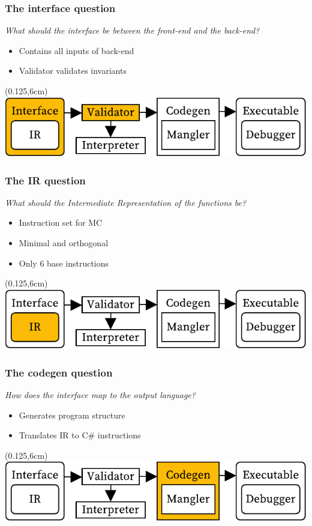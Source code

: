 \documentclass[xetex,serif,aspectratio=169]{beamer}
\begin{document}
\begin{frame}[t]
\end{frame}\begin{frame}[t]\frametitle{The interface question}
\textit{What should the interface be between the front-end and the back-end?}
\begin{itemize}
    \item Contains all inputs of back-end 
    \item Validator validates invariants
\end{itemize}
\begin{textblock*}{0.75\paperwidth}(0.125\paperwidth,6cm)\includegraphics[width=0.75\paperwidth]{overview_interface}\end{textblock*}

\end{frame}\begin{frame}[t]\frametitle{The IR question}
\textit{What should the Intermediate Representation of the functions be?}
\begin{itemize}
    \item Instruction set for MC
    \item Minimal and orthogonal
    \item Only 6 base instructions
\end{itemize}
\begin{textblock*}{0.75\paperwidth}(0.125\paperwidth,6cm)\includegraphics[width=0.75\paperwidth]{overview_ir}\end{textblock*}

\end{frame}\begin{frame}[t]\frametitle{The codegen question}
\textit{How does the interface map to the output language?}
\begin{itemize}
    \item Generates program structure
    \item Translates IR to C\# instructions
\end{itemize}
\begin{textblock*}{0.75\paperwidth}(0.125\paperwidth,6cm)\includegraphics[width=0.75\paperwidth]{overview_codegen}\end{textblock*}


\end{frame}
\end{document}
